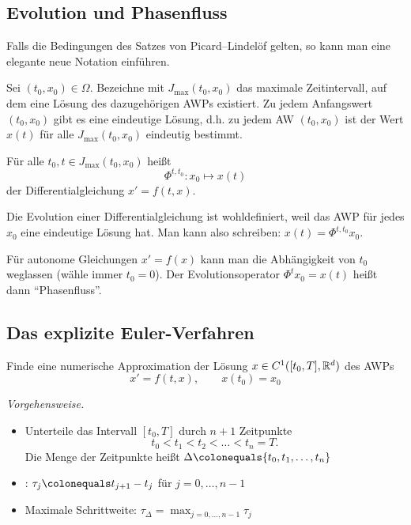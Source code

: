 \subsection{Evolution und Phasenfluss}

Falls die Bedingungen des Satzes von Picard--Lindelöf gelten, so kann man eine elegante neue Notation einführen.

Sei $(t_0,x_0) \in \Omega$. Bezeichne mit $J_{\max} (t_0,x_0)$ das maximale Zeitintervall, auf dem eine Lösung des dazugehörigen AWPs existiert.
Zu jedem Anfangswert $(t_0,x_0 )$ gibt es eine eindeutige Lösung, d.h. zu jedem AW $(t_0,x_0 )$ ist der Wert $x(t)$ für alle $J_{\max} (t_0,x_0 )$ eindeutig bestimmt.

\begin{defi}
	Für alle $t_0,t \in J_{\max} (t_0,x_0 )$ heißt
	\begin{equation*}
		\Phi^{t,t_0} \colon x_0 \mapsto x(t)
	\end{equation*}
	 der Differentialgleichung $x' = f(t,x)$.
\end{defi}

Die Evolution einer Differentialgleichung ist wohldefiniert, weil das AWP für jedes $x_0$ eine eindeutige Lösung hat. Man kann also schreiben: $x(t) = \Phi^{t,t_0} x_0$.

Für autonome Gleichungen $x'=f(x)$ kann man die Abhängigkeit von $t_0$ weglassen (wähle immer $t_0=0$). Der Evolutionsoperator $\Phi^t x_0=x(t)$ heißt dann \enquote{Phasenfluss}.

\subsection{Das explizite Euler-Verfahren}

\begin{aim}
	Finde eine numerische Approximation der Lösung $x \in C^1 ([t_0,T],\mathbb R^d)$ des AWPs
	\begin{equation*}
	x' = f(t,x),
	\qquad
	x(t_0)=x_0
	\end{equation*}
\end{aim}

\emph{Vorgehensweise.}
\begin{itemize}
	\item Unterteile das Intervall $[t_0,T ]$ durch $n+1$ Zeitpunkte
	\begin{equation}
	t_0<t_1<t_2<\ldots<t_n=T.
	\end{equation}
	Die Menge der Zeitpunkte heißt  $\Delta \colonequals \lbrace t_0,t_1,\ldots,t_n \rbrace$
	\item {}: $\tau_j\colonequals t_{j+1}-t_j$ für $j=0,\ldots,n-1$
	\item Maximale Schrittweite: $\tau_{\Delta}=\max_{j=0,\ldots,n-1} \tau_j$
\end{itemize}

